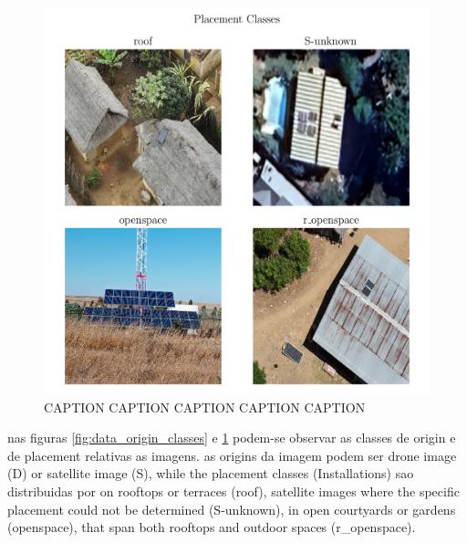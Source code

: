 \documentclass[conference]{IEEEtran}
\begin{document}
\begin{figure}[H]
    \centering
    \includegraphics[width=1\linewidth]{assets/data_placement_classes.png}
    \caption{CAPTION CAPTION CAPTION CAPTION CAPTION}
    \label{fig:data_placement_classes}
\end{figure}

nas figuras \ref{fig:data_origin_classes} e \ref{fig:data_placement_classes} podem-se observar as classes de origin e de placement relativas as imagens. as origins da imagem podem ser drone image (D) or satellite image (S), while the placement classes (Installations) sao distribuidas por on rooftops or terraces (roof), satellite images where the specific placement could not be determined (S-unknown), in open courtyards or gardens (openspace), that span both rooftops and outdoor spaces (r\_openspace).
\end{document}
